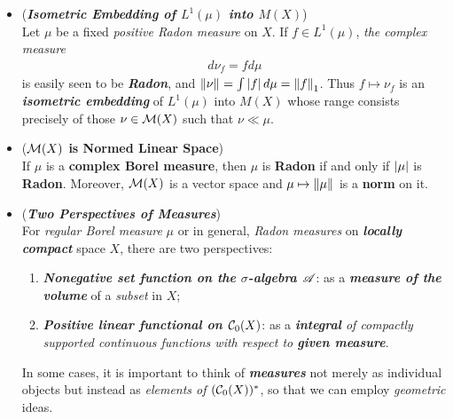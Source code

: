 \documentclass[11pt]{article}
\begin{document}
\begin{itemize}
\item \begin{remark} (\emph{\textbf{Isometric Embedding of $L^1(\mu)$ into $M(X)$}})\\
Let $\mu$ be a fixed \emph{positive Radon measure} on $X$. If $f \in L^1(\mu)$, \emph{the complex measure}
\begin{align*}
d\nu_f = f d\mu 
\end{align*}
is easily seen to be \emph{\textbf{Radon}}, and $\left\|\nu\right\|_{} = \int \left\lvert f \right\rvert d\mu = \left\|f\right\|_{1}$.
Thus $f \mapsto \nu_f$ is an \emph{\textbf{isometric embedding}} of $L^1(\mu)$ into $M(X)$ whose range consists precisely of those $\nu \in {\mathcal M}(X)$ such that $\nu \ll \mu$. 
\end{remark}

\item \begin{proposition} (\textbf{${\mathcal M}(X)$ is Normed Linear Space}) \citep{folland2013real}\\
If $\mu$ is a \textbf{complex Borel measure}, then $\mu$ is \textbf{Radon} if and only if $\left\lvert \mu \right\rvert$ is \textbf{Radon}.
Moreover, ${\mathcal M}(X)$ is a vector space and $\mu \mapsto \left\|\mu\right\|_{}$ is a \textbf{norm} on it.
\end{proposition}

\item \begin{remark} (\emph{\textbf{Two Perspectives of Measures}})\\
For \emph{regular Borel measure} $\mu$ or in general, \emph{Radon measures} on \emph{\textbf{locally compact}} space $X$, there are two perspectives:
\begin{enumerate}
\item \emph{\textbf{Nonegative set function on the $\sigma$-algebra ${\mathscr A}$}}: as a \emph{\textbf{measure of the volume}} of a \emph{subset} in $X$;
\item \emph{\textbf{Positive linear functional on ${\mathcal C}_0(X)$}}: as a \emph{\textbf{integral} of compactly supported continuous functions with respect to \textbf{given measure}}.
\end{enumerate}
In some cases, it is important to think of \emph{\textbf{measures}} not merely as individual  objects but instead as \emph{elements of $({\mathcal C}_{0}(X))^{*}$}, so that we can employ \emph{geometric} ideas. 
\end{remark}
\end{itemize}
\end{document}
